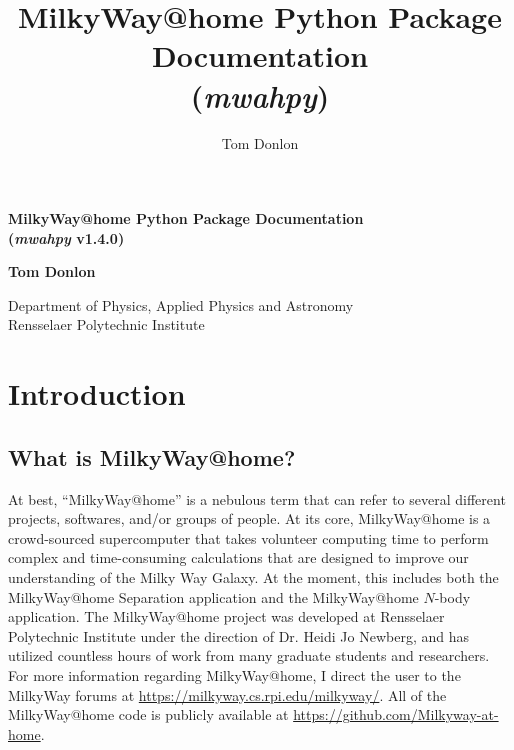 \documentclass{article}
\author{Tom Donlon}
\title{MilkyWay@home Python Package Documentation \\ (\textit{mwahpy})}
\date{}
\begin{document}
\newcommand{\mwahpy}[0]{\textit{mwahpy }}
\newcommand{\msol}{$M_\odot$}

\begin{titlepage}
   \begin{center}
       \vspace*{5cm}

       \huge\textbf{MilkyWay@home Python Package Documentation \\ (\textit{mwahpy} v1.4.0)}

       \vspace{0.5cm}
        
            
       \vspace{1.5cm}

       \large\textbf{Tom Donlon}
            
       \vspace{0.8cm}
            
       Department of Physics, Applied Physics and Astronomy\\
       Rensselaer Polytechnic Institute
            
   \end{center}
\end{titlepage}

\newpage

\tableofcontents

\newpage

\section{Introduction}

\subsection{What is MilkyWay@home?}

At best, ``MilkyWay@home'' is a nebulous term that can refer to several different projects, softwares, and/or groups of people. At its core, MilkyWay@home is a crowd-sourced supercomputer that takes volunteer computing time to perform complex and time-consuming calculations that are designed to improve our understanding of the Milky Way Galaxy. At the moment, this includes both the MilkyWay@home Separation application and the MilkyWay@home $N$-body application. The MilkyWay@home project was developed at Rensselaer Polytechnic Institute under the direction of Dr. Heidi Jo Newberg, and has utilized countless hours of work from many graduate students and researchers. For more information regarding MilkyWay@home, I direct the user to the MilkyWay forums at \url{https://milkyway.cs.rpi.edu/milkyway/}. All of the MilkyWay@home code is publicly available at \url{https://github.com/Milkyway-at-home}. 
\end{document}
